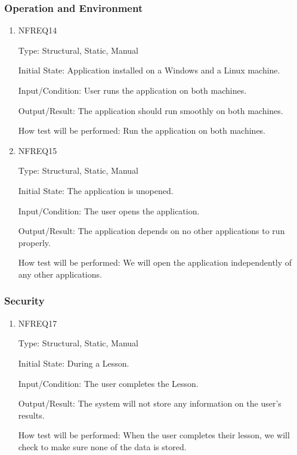 \documentclass[12pt, titlepage]{article}
\begin{document}
\subsubsection{Operation and Environment}
\begin{enumerate}

\item{NFREQ14\\}

Type: Structural, Static, Manual
					
Initial State: Application installed on a Windows and a Linux machine.
					
Input/Condition: User runs the application on both machines.
					
Output/Result: The application should run smoothly on both machines.
					
How test will be performed: Run the application on both machines.

\item{NFREQ15\\}

Type: Structural, Static, Manual
					
Initial State: The application is unopened.
					
Input/Condition: The user opens the application.
					
Output/Result: The application depends on no other applications to run properly.
					
How test will be performed: We will open the application independently of any other applications.

\end{enumerate}

\subsubsection{Security}
\begin{enumerate}

\item{NFREQ17\\}

Type: Structural, Static, Manual
					
Initial State: During a Lesson.
					
Input/Condition: The user completes the Lesson.
					
Output/Result: The system will not store any information on the user's results. 
					
How test will be performed: When the user completes their lesson, we will check to make sure none of the data is stored.

\end{enumerate}
\end{document}
